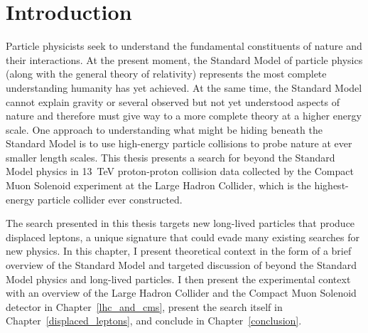 \chapter{Introduction}
\label{intro}
Particle physicists seek to understand the fundamental constituents of nature and their interactions. At the present moment, the Standard Model of particle physics (along with the general theory of relativity) represents the most complete understanding humanity has yet achieved. At the same time, the Standard Model cannot explain gravity or several observed but not yet understood aspects of nature and therefore must give way to a more complete theory at a higher energy scale. One approach to understanding what might be hiding beneath the Standard Model is to use high-energy particle collisions to probe nature at ever smaller length scales. This thesis presents a search for beyond the Standard Model physics in \SI{13}{\TeV} proton-proton collision data collected by the Compact Muon Solenoid experiment at the Large Hadron Collider, which is the highest-energy particle collider ever constructed.

The search presented in this thesis targets new long-lived particles that produce displaced leptons, a unique signature that could evade many existing searches for new physics. In this chapter, I present theoretical context in the form of a brief overview of the Standard Model and targeted discussion of beyond the Standard Model physics and long-lived particles. I then present the experimental context with an overview of the Large Hadron Collider and the Compact Muon Solenoid detector in Chapter~\ref{lhc_and_cms}, present the search itself in Chapter~\ref{displaced_leptons}, and conclude in Chapter~\ref{conclusion}. 



